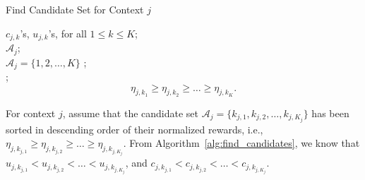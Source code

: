 \begin{algorithm}[htbp]
\caption{Find Candidate Set for Context $j$}
\label{alg:find_candidates}
\begin{algorithmic}
 $c_{j,k}$'s, $u_{j,k}$'s, for all $1 \leq k \leq K$;\\
 $\mathcal{A}_j$;\\
 $\mathcal{A}_j = \{1,2,\ldots, K\}$ ;\\
; \\
 \begin{equation}
 \eta_{j,k_{1}} \geq \eta_{j,k_{2}} \geq  \ldots \geq \eta_{j,k_{K}}. \nonumber
 \end{equation}
\ENDIF
\ENDFOR
{}
\ENDWHILE
\end{algorithmic}
\end{algorithm}

For context $j$, assume that the candidate set $\mathcal{A}_j = \{k_{j,1}, k_{j,2}, \ldots, k_{j, K_j}\}$ has been sorted in descending order of their normalized rewards, i.e., $\eta_{j,k_{j,1}} \geq \eta_{j,k_{j,2}} \geq \ldots \geq \eta_{j, k_{j, K_j}}$. From Algorithm~\ref{alg:find_candidates}, we know that $u_{j, k_{j,1}} < u_{j, k_{j,2}} < \ldots < u_{j, k_{j, K_j}}$, and $ c_{j, k_{j,1}} < c_{j, k_{j,2}} < \ldots < c_{j, k_{j, K_j}}$.

